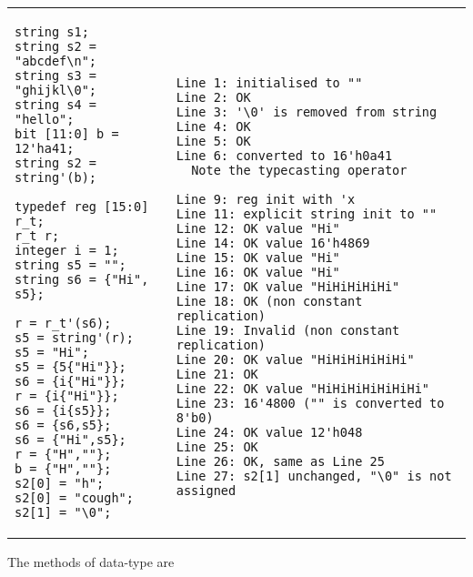 \begin{table}
\begin{tabular}{p{} p{}}
\begin{lstlisting}[label=dt!literal!struct, caption=Structure Literals]
string s1;
string s2 = "abcdef\n";
string s3 = "ghijkl\0";
string s4 = "hello";
bit [11:0] b = 12'ha41;
string s2 = string'(b);

typedef reg [15:0] r_t;
r_t r;
integer i = 1;
string s5 = "";
string s6 = {"Hi", s5};

r = r_t'(s6);
s5 = string'(r);
s5 = "Hi";
s5 = {5{"Hi"}};
s6 = {i{"Hi"}};
r = {i{"Hi"}};
s6 = {i{s5}};
s6 = {s6,s5};
s6 = {"Hi",s5};
r = {"H",""};
b = {"H",""};
s2[0] = "h";
s2[0] = "cough";
s2[1] = "\0";
\end{lstlisting}
&
\begin{tbldesc}
\begin{verbatim}


Line 1: initialised to ""
Line 2: OK
Line 3: '\0' is removed from string
Line 4: OK
Line 5: OK
Line 6: converted to 16'h0a41
  Note the typecasting operator

Line 9: reg init with 'x
Line 11: explicit string init to ""
Line 12: OK value "Hi"
Line 14: OK value 16'h4869
Line 15: OK value "Hi"
Line 16: OK value "Hi"
Line 17: OK value "HiHiHiHiHi"
Line 18: OK (non constant replication)
Line 19: Invalid (non constant replication)
Line 20: OK value "HiHiHiHiHiHi"
Line 21: OK
Line 22: OK value "HiHiHiHiHiHiHi"
Line 23: 16'4800 ("" is converted to 8'b0)
Line 24: OK value 12'h048
Line 25: OK
Line 26: OK, same as Line 25
Line 27: s2[1] unchanged, "\0" is not assigned
\end{verbatim}
\end{tbldesc}
\end{tabular}
\end{table}

The methods of \kwstring data-type are

